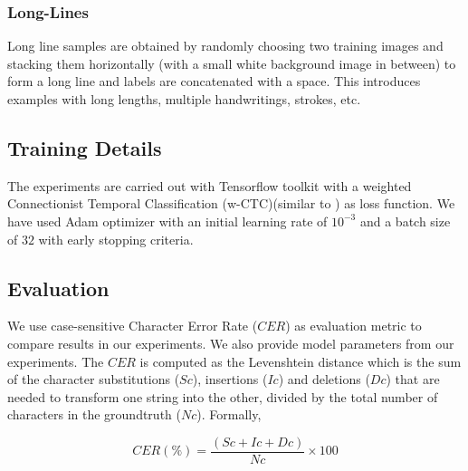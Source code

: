 \documentclass{article}
\begin{document}
\subsubsection{Long-Lines} \label{long-lines}
Long line samples are obtained by randomly choosing two training images and stacking them horizontally (with a small white background image in between) to form a long line and labels are concatenated with a space. This introduces examples with long lengths, multiple handwritings, strokes, etc. 

\subsection{Training Details}
The experiments are carried out with Tensorflow\cite{abadi2016tensorflow} toolkit with a weighted Connectionist Temporal Classification (w-CTC)(similar to \cite{Chaudhary2021EASTER}) as loss function. We have used Adam optimizer with an initial learning rate of $10^{-3}$ and a batch size of $32$ with early stopping criteria. 
\subsection{Evaluation}
We use case-sensitive Character Error Rate ($CER$) as evaluation metric to compare results in our experiments. We also provide model parameters from our experiments. The $CER$ is computed as the Levenshtein distance which is the
sum of the character substitutions ($Sc$), insertions ($Ic$) and
deletions ($Dc$) that are needed to transform one string into
the other, divided by the total number of characters in the
groundtruth ($Nc$). Formally,

\begin{equation}
    CER(\%) = {\frac{(Sc + Ic + Dc)}{Nc}}\times{100}
\end{equation}
\end{document}
